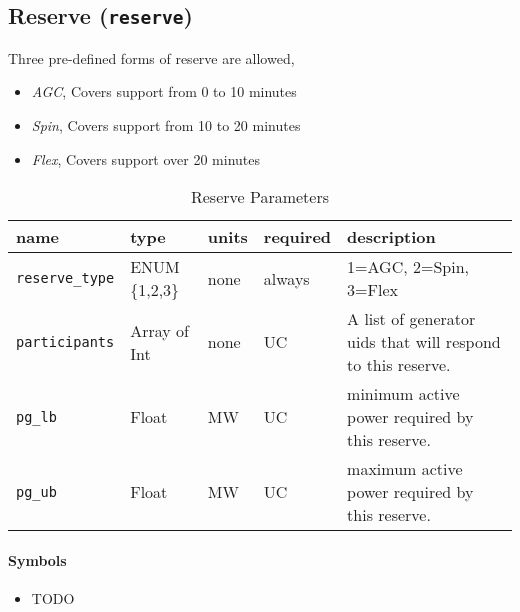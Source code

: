 \documentclass{article}
\begin{document}
\subsection{Reserve (\texttt{reserve})}

Three pre-defined forms of reserve are allowed,
\begin{itemize}
    \item {\em AGC}, Covers support from 0 to 10 minutes
    \item {\em Spin}, Covers support from 10 to 20 minutes
    \item {\em Flex}, Covers support over 20 minutes
\end{itemize}


\begin{table}[h!]
\centering
\caption{Reserve Parameters}
\begin{tabular}{|l|l|l|l|p{6cm}|}
\hline
name & type & units & required & description \\ 
\hline
\hline
\texttt{reserve\_type} & ENUM \{1,2,3\} & none & always & 1=AGC, 2=Spin, 3=Flex \\ 
\hline
\texttt{participants} & Array of Int & none & UC & A list of generator uids that will respond to this reserve.\\ 
\hline
\texttt{pg\_lb} & Float & MW & UC & minimum active power required by this reserve. \\ 
\hline
\texttt{pg\_ub} & Float & MW & UC & maximum active power required by this reserve. \\ 
\hline
\end{tabular}
\label{tbl:reserve}
\end{table}


\paragraph{Symbols}
\begin{itemize}
    \item TODO
\end{itemize}
\end{document}
